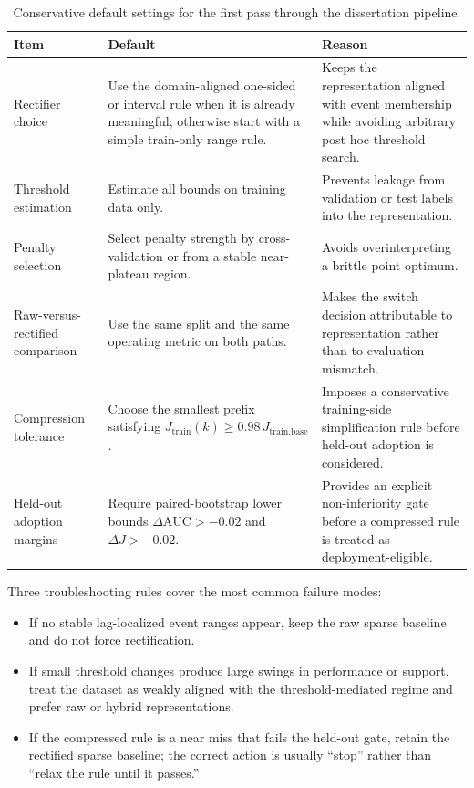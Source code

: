 \begin{table}[p]
    \caption[Conservative defaults for a new dataset.]{Conservative default settings for the first pass through the dissertation pipeline.}
    \label{tab:workflow_defaults}
    \centering
        {\footnotesize
        \setlength{\tabcolsep}{3pt}
        \renewcommand{\arraystretch}{0.95}
        \begin{tabularx}{0.96\textwidth}{>{\RaggedRight\arraybackslash}p{}>{\RaggedRight\arraybackslash}p{}>{\RaggedRight\arraybackslash}X}
            Item & Default & Reason \\ \hline
            Rectifier choice & Use the domain-aligned one-sided or interval rule when it is already meaningful; otherwise start with a simple train-only range rule. & Keeps the representation aligned with event membership while avoiding arbitrary post hoc threshold search. \\ \hline
            Threshold estimation & Estimate all bounds on training data only. & Prevents leakage from validation or test labels into the representation. \\ \hline
            Penalty selection & Select penalty strength by cross-validation or from a stable near-plateau region. & Avoids overinterpreting a brittle point optimum. \\ \hline
            Raw-versus-rectified comparison & Use the same split and the same operating metric on both paths. & Makes the switch decision attributable to representation rather than to evaluation mismatch. \\ \hline
            Compression tolerance & Choose the smallest prefix satisfying $J_{\text{train}}(k)\geq 0.98\,J_{\text{train,base}}$. & Imposes a conservative training-side simplification rule before held-out adoption is considered. \\ \hline
            Held-out adoption margins & Require paired-bootstrap lower bounds $\Delta \mathrm{AUC}>-0.02$ and $\Delta J>-0.02$. & Provides an explicit non-inferiority gate before a compressed rule is treated as deployment-eligible. \\ \hline
        \end{tabularx}
        }
\end{table}

Three troubleshooting rules cover the most common failure modes:
\begin{itemize}
    \item If no stable lag-localized event ranges appear, keep the raw sparse baseline and do not force rectification.
    \item If small threshold changes produce large swings in performance or support, treat the dataset as weakly aligned with the threshold-mediated regime and prefer raw or hybrid representations.
    \item If the compressed rule is a near miss that fails the held-out gate, retain the rectified sparse baseline; the correct action is usually ``stop'' rather than ``relax the rule until it passes.''
\end{itemize}

